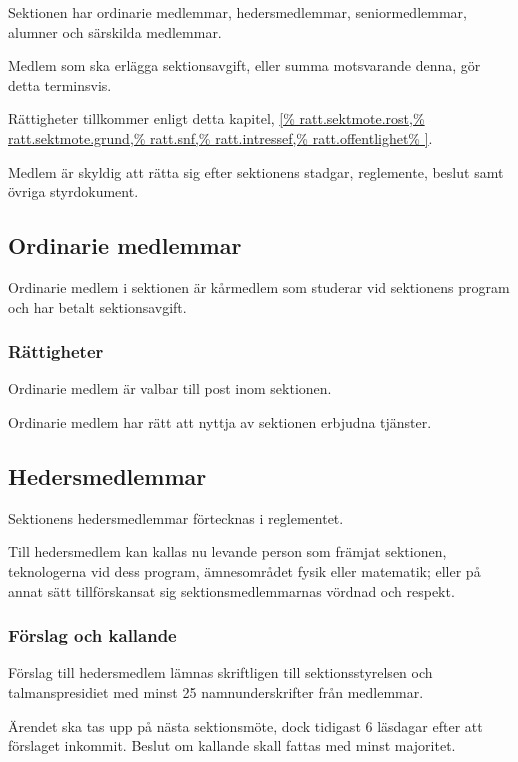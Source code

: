 \documentclass{styrdokument}
\begin{document}
\? Sektionen har ordinarie medlemmar, hedersmedlemmar, seniormedlemmar, alumner och särskilda medlemmar.

\? Medlem som ska erlägga sektionsavgift, eller summa motsvarande denna, gör detta terminsvis.

\? Rättigheter tillkommer enligt detta kapitel,
\cref{%
  ratt.sektmote.rost,%
  ratt.sektmote.grund,%
  ratt.snf,%
  ratt.intressef,%
  ratt.offentlighet%
}.

\? Medlem är skyldig att rätta sig efter sektionens stadgar, reglemente, beslut samt övriga styrdokument.


\subsection{Ordinarie medlemmar}

\? Ordinarie medlem i sektionen är kårmedlem som studerar vid sektionens program och har betalt sektionsavgift.

\subsubsection{Rättigheter}
\? Ordinarie medlem är valbar till post inom sektionen.

\? Ordinarie medlem har rätt att nyttja av sektionen erbjudna tjänster.

\subsection{Hedersmedlemmar}

\? Sektionens hedersmedlemmar förtecknas i reglementet.

\? Till hedersmedlem kan kallas nu levande person som främjat sektionen, teknologerna vid dess program, ämnesområdet fysik eller matematik; eller på annat sätt tillförskansat sig sektionsmedlemmarnas vördnad och respekt.

\subsubsection{Förslag och kallande}
\? Förslag till hedersmedlem lämnas skriftligen till sektionsstyrelsen och talmanspresidiet med minst 25 namnunderskrifter från medlemmar.

\? Ärendet ska tas upp på nästa sektionsmöte, dock tidigast 6 läsdagar efter att förslaget inkommit.
Beslut om kallande skall fattas med minst  majoritet.
\label{beslut.heders.kallande}
  
\end{document}
